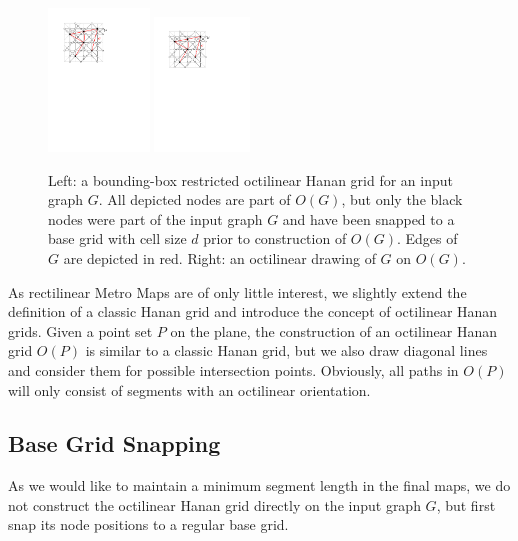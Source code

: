 \documentclass[sigconf]{acmart}
\begin{document}
\begin{figure}
    \centering
	\includegraphics[width=0.24\textwidth]{figures2/node.pdf}
	\hfill
	\includegraphics[width=0.2257\textwidth,trim=0 0 15 0, clip, page=2]{figures2/node.pdf}
	\caption{Left: a bounding-box restricted octilinear Hanan grid for an input graph $G$. All depicted nodes are part of $O(G)$, but only the black nodes were part of the input graph $G$ and have been snapped to a base grid with cell size $d$ prior to construction of $O(G)$. Edges of $G$ are depicted in red. Right: an octilinear drawing of $G$ on $O(G)$.}
	\label{FIG:octihanangrid}
	\vspace{-.65cm}
\end{figure}

As rectilinear Metro Maps are of only little interest, we slightly extend the definition of a classic Hanan grid and introduce the concept of octilinear Hanan grids.
Given a point set $P$ on the plane, the construction of an octilinear Hanan grid $O(P)$ is similar to a classic Hanan grid, but we also draw diagonal lines and consider them for possible intersection points.
Obviously, all paths in $O(P)$ will only consist of segments with an octilinear orientation.

\subsection{Base Grid Snapping}

As we would like to maintain a minimum segment length in the final maps, we do not construct the octilinear Hanan grid directly on the input graph $G$, but first snap its node positions to a regular base grid.
\end{document}
